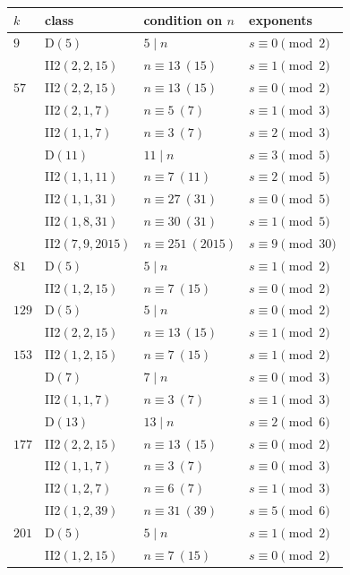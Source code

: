 \documentclass[11pt,reqno]{amsart}
\theoremstyle{definition}
\begin{document}
\begin{table}[ht]
\centering\small
\begin{tabular}{llll}
\toprule
$k$ & class & condition on $n$ & exponents\\
\midrule
$9$ & D$(5)$ & $5\mid n$ & $s\equiv 0\pmod{2}$ \\
 & II2$(2,2,15)$ & $n\equiv13\ (15)$ & $s\equiv 1\pmod{2}$ \\
\midrule
$57$ & II2$(2,2,15)$ & $n\equiv13\ (15)$ & $s\equiv 0\pmod{2}$ \\
 & II2$(2,1,7)$ & $n\equiv5\ (7)$ & $s\equiv 1\pmod{3}$ \\
 & II2$(1,1,7)$ & $n\equiv3\ (7)$ & $s\equiv 2\pmod{3}$ \\
 & D$(11)$ & $11\mid n$ & $s\equiv 3\pmod{5}$ \\
 & II2$(1,1,11)$ & $n\equiv7\ (11)$ & $s\equiv 2\pmod{5}$ \\
 & II2$(1,1,31)$ & $n\equiv27\ (31)$ & $s\equiv 0\pmod{5}$ \\
 & II2$(1,8,31)$ & $n\equiv30\ (31)$ & $s\equiv 1\pmod{5}$ \\
 & II2$(7,9,2015)$ & $n\equiv251\ (2015)$ & $s\equiv 9\pmod{30}$ \\
\midrule
$81$ & D$(5)$ & $5\mid n$ & $s\equiv 1\pmod{2}$ \\
 & II2$(1,2,15)$ & $n\equiv7\ (15)$ & $s\equiv 0\pmod{2}$ \\
\midrule
$129$ & D$(5)$ & $5\mid n$ & $s\equiv 0\pmod{2}$ \\
 & II2$(2,2,15)$ & $n\equiv13\ (15)$ & $s\equiv 1\pmod{2}$ \\
\midrule
$153$ & II2$(1,2,15)$ & $n\equiv7\ (15)$ & $s\equiv 1\pmod{2}$ \\
 & D$(7)$ & $7\mid n$ & $s\equiv 0\pmod{3}$ \\
 & II2$(1,1,7)$ & $n\equiv3\ (7)$ & $s\equiv 1\pmod{3}$ \\
 & D$(13)$ & $13\mid n$ & $s\equiv 2\pmod{6}$ \\
\midrule
$177$ & II2$(2,2,15)$ & $n\equiv13\ (15)$ & $s\equiv 0\pmod{2}$ \\
 & II2$(1,1,7)$ & $n\equiv3\ (7)$ & $s\equiv 0\pmod{3}$ \\
 & II2$(1,2,7)$ & $n\equiv6\ (7)$ & $s\equiv 1\pmod{3}$ \\
 & II2$(1,2,39)$ & $n\equiv31\ (39)$ & $s\equiv 5\pmod{6}$ \\
\midrule
$201$ & D$(5)$ & $5\mid n$ & $s\equiv 1\pmod{2}$ \\
 & II2$(1,2,15)$ & $n\equiv7\ (15)$ & $s\equiv 0\pmod{2}$ \\

\end{tabular}
\end{table}
\end{document}
